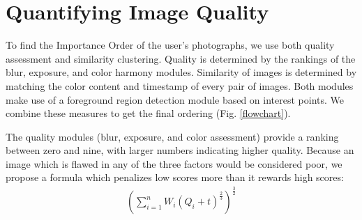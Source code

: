 \documentclass{article}
\begin{document}


\section{Quantifying Image Quality}
\begin{figure*}
  \centering
  \caption{Interest points are used to find the foreground subject. Blur detection, color harmony, and exposure algorithms calculate an image's quality rating. The color distribution of the local foreground subject, and global image, coupled with the timestamp, cluster images into groups. A reordering of the input results, allowing the user to remove images at the end of this ordering.}
  \label{flowchart}
\end{figure*}

To find the Importance Order of the user's photographs, we use both quality assessment and similarity clustering. Quality is determined by the rankings of the blur, exposure, and color harmony modules. Similarity of images is determined by matching the color content and timestamp of every pair of images. Both modules make use of a foreground region detection module based on interest points. We combine these measures to get the final ordering (Fig. \ref{flowchart}).

The quality modules (blur, exposure, and color assessment) provide a ranking between zero and nine, with larger numbers indicating higher quality. Because an image which is flawed in any of the three factors would be considered poor, we propose a formula which penalizes low scores more than it rewards high scores:
\begin{eqnarray}
\left(\displaystyle\sum\limits_{i=1}^nW_i\left({Q_i+t}\right)^\frac{2}{3}\right)^\frac{3}{2}
\end{eqnarray}
\end{document}
